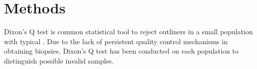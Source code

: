 \chapter{Methods}

Dixon's Q test is common statistical tool to reject outliners in a small population with typical . Due to the lack of persistent quality control mechanisms in obtaining biopsies, Dixon's Q test has been conducted on each population to distinguish possible invalid samples. 